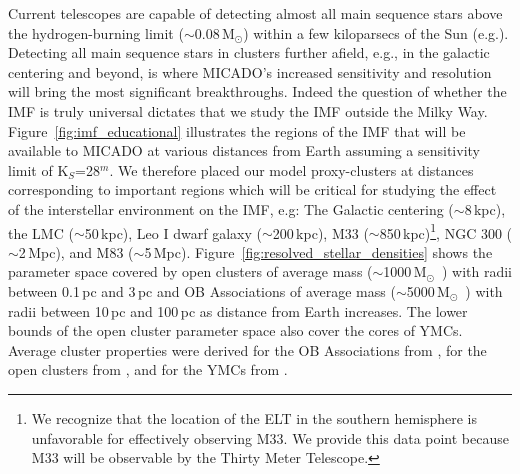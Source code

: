 \documentclass[referee]{aa}
\newcommand{\msun}{M$_\odot$~}
\newcommand{\msune}{M$_\odot$}
\newcommand{\s}{$\sim$}
\begin{document}
Current telescopes are capable of detecting almost all main sequence stars above the hydrogen-burning limit (\s0.08\,\msune) within a few kiloparsecs of the Sun (e.g.\~\citealt{muzic17}).
Detecting all main sequence stars in clusters further afield, e.g., in the galactic centering and beyond, is where MICADO's increased sensitivity and resolution will bring the most significant breakthroughs.
Indeed the question of whether the IMF is truly universal dictates that we study the IMF outside the Milky Way.
Figure~\ref{fig:imf_educational} illustrates the regions of the IMF that will be available to MICADO at various distances from Earth assuming a sensitivity limit of K$_S$=28$^m$.
We therefore placed our model proxy-clusters at distances corresponding to important regions which will be critical for studying the effect of the interstellar environment on the IMF, e.g: The Galactic centering (\s8\,kpc), the LMC (\s50\,kpc), Leo I dwarf galaxy (\s200\,kpc), M33 (\s850\,kpc)\footnote{We recognize that the location of the ELT in the southern hemisphere is unfavorable for effectively observing M33.
We provide this data point because M33 will be observable by the Thirty Meter Telescope.}, NGC 300 (\s2\,Mpc), and M83 (\s5\,Mpc).
Figure~\ref{fig:resolved_stellar_densities} shows the parameter space covered by open clusters of average mass (\s1000\,\msun) with radii between 0.1\,pc and 3\,pc and OB Associations of average mass (\s5000\,\msun) with radii between 10\,pc and 100\,pc as distance from Earth increases.
The lower bounds of the open cluster parameter space also cover the cores of YMCs. Average cluster properties were derived for the OB Associations from \citet{melnik1995}, for the open clusters from \citet{piskunov2007}, and for the YMCs from \citet{portegies2010}.
\end{document}
